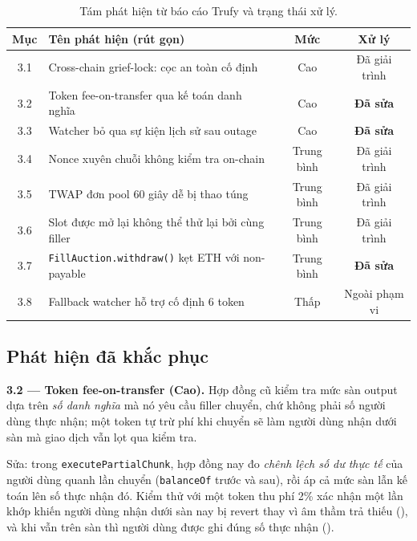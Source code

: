 \documentclass[../DoAn.tex]{subfiles}
\begin{document}
\begin{table}[H]
\centering
\small
\begin{tabular}{|c|p{7.2cm}|c|c|}
\hline
\textbf{Mục} & \textbf{Tên phát hiện (rút gọn)} & \textbf{Mức} & \textbf{Xử lý} \\
\hline
3.1 & Cross-chain grief-lock: cọc an toàn cố định & Cao & Đã giải trình \\
\hline
3.2 & Token fee-on-transfer qua kế toán danh nghĩa & Cao & \textbf{Đã sửa} \\
\hline
3.3 & Watcher bỏ qua sự kiện lịch sử sau outage & Cao & \textbf{Đã sửa} \\
\hline
3.4 & Nonce xuyên chuỗi không kiểm tra on-chain & Trung bình & Đã giải trình \\
\hline
3.5 & TWAP đơn pool 60 giây dễ bị thao túng & Trung bình & Đã giải trình \\
\hline
3.6 & Slot được mở lại không thể thử lại bởi cùng filler & Trung bình & Đã giải trình \\
\hline
3.7 & \texttt{FillAuction.withdraw()} kẹt ETH với non-payable & Trung bình & \textbf{Đã sửa} \\
\hline
3.8 & Fallback watcher hỗ trợ cố định 6 token & Thấp & Ngoài phạm vi \\
\hline
\end{tabular}
\caption{Tám phát hiện từ báo cáo Trufy và trạng thái xử lý.}
\label{tab:trufy}
\end{table}

\subsection{Phát hiện đã khắc phục}

\textbf{3.2 --- Token fee-on-transfer (Cao).}
Hợp đồng cũ kiểm tra mức sàn output dựa trên \emph{số danh nghĩa} mà nó yêu cầu filler chuyển, chứ không phải số người dùng thực nhận; một token tự trừ phí khi chuyển sẽ làm người dùng nhận dưới sàn mà giao dịch vẫn lọt qua kiểm tra.

Sửa: trong \texttt{executePartialChunk}, hợp đồng nay đo \emph{chênh lệch số dư thực tế} của người dùng quanh lần chuyển (\texttt{balanceOf} trước và sau), rồi áp cả mức sàn lẫn kế toán lên số thực nhận đó. Kiểm thử với một token thu phí 2\% xác nhận một lần khớp khiến người dùng nhận dưới sàn nay bị revert thay vì âm thầm trả thiếu (), và khi vẫn trên sàn thì người dùng được ghi đúng số thực nhận ().
\end{document}

